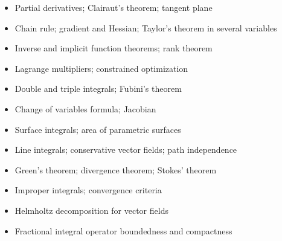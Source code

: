 \documentclass{amsart}
\begin{document}
\begin{itemize}
  \item Partial derivatives; Clairaut's theorem; tangent plane
  \item Chain rule; gradient and Hessian; Taylor's theorem in several variables
  \item Inverse and implicit function theorems; rank theorem
  \item Lagrange multipliers; constrained optimization
  \item Double and triple integrals; Fubini's theorem
  \item Change of variables formula; Jacobian
  \item Surface integrals; area of parametric surfaces
  \item Line integrals; conservative vector fields; path independence
  \item Green's theorem; divergence theorem; Stokes' theorem
  \item Improper integrals; convergence criteria
  \item Helmholtz decomposition for vector fields
  \item Fractional integral operator boundedness and compactness
\end{itemize}
\end{document}
